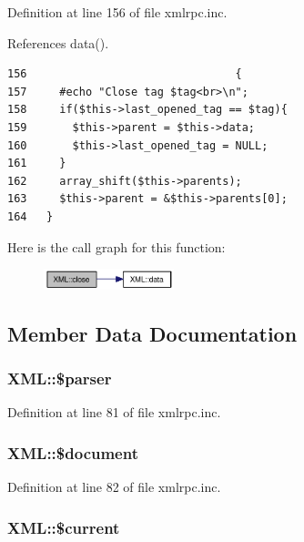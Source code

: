 Definition at line 156 of file xmlrpc.inc.

References data().

\begin{Code}\begin{verbatim}156                                {
157     #echo "Close tag $tag<br>\n";
158     if($this->last_opened_tag == $tag){
159       $this->parent = $this->data;
160       $this->last_opened_tag = NULL;
161     }
162     array_shift($this->parents);
163     $this->parent = &$this->parents[0];
164   }
\end{verbatim}
\end{Code}




Here is the call graph for this function:\nopagebreak
\begin{figure}[H]
\begin{center}
\leavevmode
\includegraphics[width=107pt]{classXML_60144a2134fc1b7f5b4b1b6a7c56bf04_cgraph}
\end{center}
\end{figure}


\subsection{Member Data Documentation}
\hypertarget{classXML_fa14fbca44236b30ab5f3dcfc4b02890}{
\subsubsection{\setlength{\rightskip}{0pt plus 5cm}XML::\$parser}}
\label{classXML_fa14fbca44236b30ab5f3dcfc4b02890}




Definition at line 81 of file xmlrpc.inc.\hypertarget{classXML_01d565098eeda8bf09e4242a2748d570}{
\subsubsection{\setlength{\rightskip}{0pt plus 5cm}XML::\$document}}
\label{classXML_01d565098eeda8bf09e4242a2748d570}




Definition at line 82 of file xmlrpc.inc.\hypertarget{classXML_7c20d75c1719294f3320a537a32753ca}{
\subsubsection{\setlength{\rightskip}{0pt plus 5cm}XML::\$current}}
\label{classXML_7c20d75c1719294f3320a537a32753ca}




